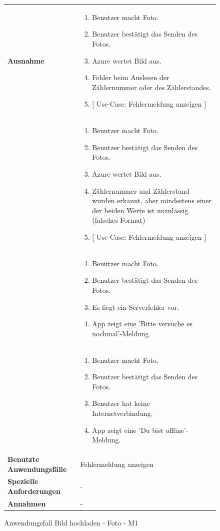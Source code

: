 \begin{figure}[H]
	\centering
	\begin{tabularx}{\textwidth}{ X | X }
	 \hline
		\textbf{Ausnahme} &
		\begin{enumerate}
			\item Benutzer macht Foto.
			\item Benutzer bestätigt das Senden des Fotos.
			\item Azure wertet Bild aus.
			\item Fehler beim Auslesen der Zählernummer oder des Zählerstandes.
			\item $\lbrack$ Use-Case: Fehlermeldung anzeigen $\rbrack$
		\end{enumerate} \\ &
		\begin{enumerate}
			\item Benutzer macht Foto.
			\item Benutzer bestätigt das Senden des Fotos.
			\item Azure wertet Bild aus.
			\item Zählernummer und Zählerstand wurden erkannt, aber mindestens einer der beiden Werte ist unzulässig. (falsches Format)
			\item $\lbrack$ Use-Case: Fehlermeldung anzeigen $\rbrack$
		\end{enumerate} \\  &
		\begin{enumerate}
			\item Benutzer macht Foto.
			\item Benutzer bestätigt das Senden des Fotos.
			\item Es liegt ein Serverfehler vor.
			\item App zeigt eine 'Bitte versuche es nochmal'-Meldung.
		\end{enumerate} \\  &
		\begin{enumerate}
			\item Benutzer macht Foto.
			\item Benutzer bestätigt das Senden des Fotos.
			\item Benutzer hat keine Internetverbindung.
			\item App zeigt eine 'Du bist offline'-Meldung.
		\end{enumerate} \\ \hline
		\textbf{Benutzte Anwendungsfälle} & Fehlermeldung anzeigen \\ \hline
		\textbf{Spezielle Anforderungen} & - \\ \hline
		\textbf{Annahmen} & -
	\end{tabularx}
	\caption{Anwendungsfall Bild hochladen - Foto - M1}
	\label{fig:anwendungsfall-server-tabelle-xx-1}
\end{figure}

